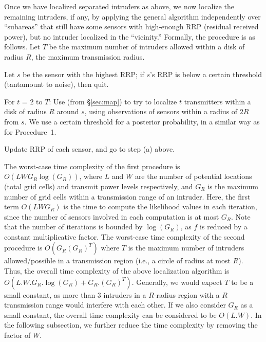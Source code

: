   Once we
have localized separated intruders as above, we now localize the remaining
intruders, if any, by applying the general \map algorithm
independently over ``subareas'' that still have some sensors with
high-enough RRP (residual received power), but no intruder localized
in the ``vicinity.'' Formally, the procedure is as follows. Let $T$ be
the maximum number of intruders allowed within a disk of radius $R$,
the maximum transmission radius.

\begin{packedalpha}
 \item
Let $s$ be the sensor with the highest RRP; if $s$'s RRP is below a
certain threshold (tantamount to noise), then quit.

\item
For $t$ = 2 to $T$: Use \map (from \S\ref{sec:map}) to try to localize
$t$ transmitters within a disk of radius $R$ around $s$, using
observations of sensors within a radius of $2R$ from $s$. We use a
certain threshold for a posterior probability, in a similar way as for
Procedure~1.

\item
Update RRP of each sensor, and go to step (a) above.
\end{packedalpha}

 The worst-case time complexity of the first procedure is \\
$O(LWG_R\log(G_R))$, where $L$ and $W$ are the number
of potential locations (total grid cells) and transmit power levels
respectively, and $G_R$ is the maximum number of grid cells within a
transmission range of an intruder.
Here, the first term $O(LWG_R)$ is the time to compute the likelihood
values in each iteration, since the number of sensors involved in each
computation is at most $G_R$. Note that the number of iterations is
bounded by $\log(G_R)$, as $f$ is reduced by a constant multiplicative
factor.
The worst-case time complexity of the second procedure is
$O(G_R(G_R)^T)$ where $T$ is the maximum number of intruders
allowed/possible in a transmission region (i.e., a circle of radius at
most $R$).
Thus, the overall time complexity of the above localization algorithm
is $O(L.W.G_R.\log(G_R) + G_R.(G_R)^T)$.
Generally, we would expect $T$ to be a small constant, as more than 3
intruders in a $R$-radius region with a $R$ transmission range would
interfere with each other. If we also consider $G_R$ as a small
constant, the overall time complexity can be considered to be
$O(L.W)$.  In the following subsection, we further reduce the time
complexity by removing the factor of $W$.

